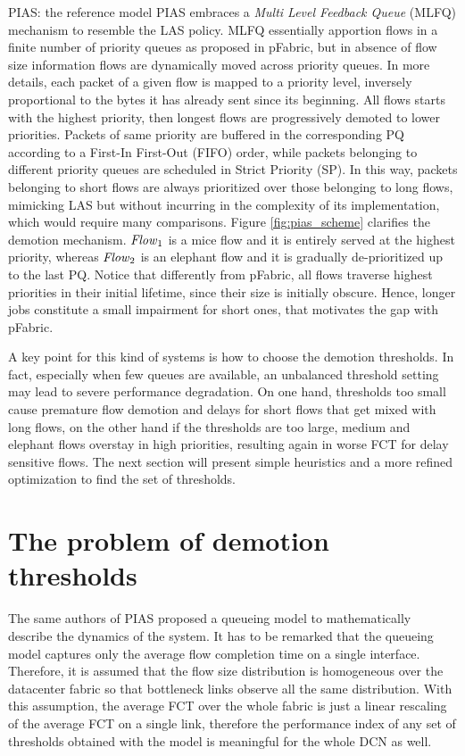 \begin{subsection}{PIAS: the reference model}
	PIAS embraces a \emph{Multi Level Feedback Queue} (MLFQ) mechanism to resemble the LAS policy. MLFQ essentially apportion flows in a finite number of priority queues as proposed in pFabric, but in absence of flow size information flows are dynamically moved across priority queues. In more details, each packet of a given flow is mapped to a priority level, inversely proportional to the bytes it has already sent since its beginning. All flows starts with the highest priority, then longest flows are progressively demoted to lower priorities. Packets of same priority are buffered in the corresponding PQ according to a First-In First-Out (FIFO) order, while packets belonging to different priority queues are scheduled in Strict Priority (SP). In this way, packets belonging to short flows are always prioritized over those belonging to long flows, mimicking LAS but without incurring in the complexity of its implementation, which would require many comparisons. Figure \ref{fig:pias_scheme} clarifies the demotion mechanism. $\text{\emph{Flow}}_1$ is a mice flow and it is entirely served at the highest priority, whereas $\text{\emph{Flow}}_2$ is an elephant flow and it is gradually de-prioritized up to the last PQ. Notice that differently from pFabric, all flows traverse highest priorities in their initial lifetime, since their size is initially obscure. Hence, longer jobs constitute a small impairment for short ones, that motivates the gap with pFabric.

A key point for this kind of systems is how to choose the demotion thresholds. In fact, especially when few queues are available, an unbalanced threshold setting may lead to severe performance degradation. On one hand, thresholds too small cause premature flow demotion and delays for short flows that get mixed with long flows, on the other hand if the thresholds are too large, medium and elephant flows overstay in high priorities, resulting again in worse FCT for delay sensitive flows. The next section will present simple heuristics and a more refined optimization to find the set of thresholds.
\end{subsection}

\section{The problem of demotion thresholds}
The same authors of PIAS proposed a queueing model to mathematically describe the dynamics of the system. It has to be remarked that the queueing model captures only the average flow completion time on a single interface. Therefore, it is assumed that the flow size distribution is homogeneous over the datacenter fabric so that bottleneck links observe all the same distribution. With this assumption, the average FCT over the whole fabric is just a linear rescaling of the average FCT on a single link, therefore the performance index of any set of thresholds obtained with the model is meaningful for the whole DCN as well. 

